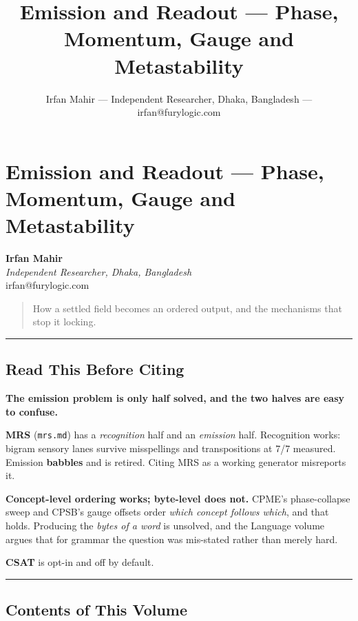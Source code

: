 \documentclass[
  11pt,
  a4paper,
]{article}
\title{Emission and Readout --- Phase, Momentum, Gauge and
Metastability}
\author{Irfan Mahir --- Independent Researcher, Dhaka, Bangladesh ---
irfan@furylogic.com}
\date{}
\begin{document}
\maketitle

{
\hypersetup{linkcolor=}
\setcounter{tocdepth}{2}
\tableofcontents
}
\section{Emission and Readout --- Phase, Momentum, Gauge and
Metastability}\label{emission-and-readout-phase-momentum-gauge-and-metastability}

\textbf{Irfan Mahir}\\
\emph{Independent Researcher, Dhaka, Bangladesh}\\
irfan@furylogic.com

\begin{quote}
How a settled field becomes an ordered output, and the mechanisms that
stop it locking.
\end{quote}

\begin{center}\rule{0.5\linewidth}{0.5pt}\end{center}

\subsection{Read This Before Citing}\label{read-this-before-citing}

\textbf{The emission problem is only half solved, and the two halves are
easy to confuse.}

\textbf{MRS} (\texttt{mrs.md}) has a \emph{recognition} half and an
\emph{emission} half. Recognition works: bigram sensory lanes survive
misspellings and transpositions at 7/7 measured. Emission
\textbf{babbles} and is retired. Citing MRS as a working generator
misreports it.

\textbf{Concept-level ordering works; byte-level does not.} CPME's
phase-collapse sweep and CPSB's gauge offsets order \emph{which concept
follows which}, and that holds. Producing the \emph{bytes of a word} is
unsolved, and the Language volume argues that for grammar the question
was mis-stated rather than merely hard.

\textbf{CSAT} is opt-in and off by default.

\begin{center}\rule{0.5\linewidth}{0.5pt}\end{center}

\subsection{Contents of This Volume}\label{contents-of-this-volume}
\end{document}
